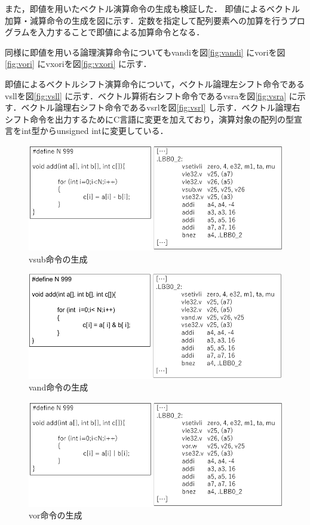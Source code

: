 また，即値を用いたベクトル演算命令の生成も検証した．
即値によるベクトル加算・減算命令の生成を図に示す．定数を指定して配列要素への加算を行うプログラムを入力することで即値による加算命令となる．

同様に即値を用いる論理演算命令についてもvandiを図\ref{fig:vandi}
にvoriを図\ref{fig:vori}
にvxoriを図\ref{fig:vxori}
に示す．

即値によるベクトルシフト演算命令について，ベクトル論理左シフト命令であるvsllを図\ref{fig:vsll}
に示す．ベクトル算術右シフト命令であるvsraを図\ref{fig:vsra}
に示す．ベクトル論理右シフト命令であるvsrlを図\ref{fig:vsrl}
し示す．ベクトル論理右シフト命令を出力するためにC言語に変更を加えており，演算対象の配列の型宣言をint型からunsigned intに変更している．

\begin{figure}
    \centering
    \includegraphics[scale=0.8]{image/vsub.pdf}
    \caption{vsub命令の生成}
    \label{fig:vsub}
\end{figure}

\begin{figure}
    \centering
    \includegraphics[scale=0.8]{image/vand.pdf}
    \caption{vand命令の生成}
    \label{fig:vand}
\end{figure}

\begin{figure}
    \centering
    \includegraphics[scale=0.8]{image/vor.pdf}
    \caption{vor命令の生成}
    \label{fig:vor}
\end{figure}

